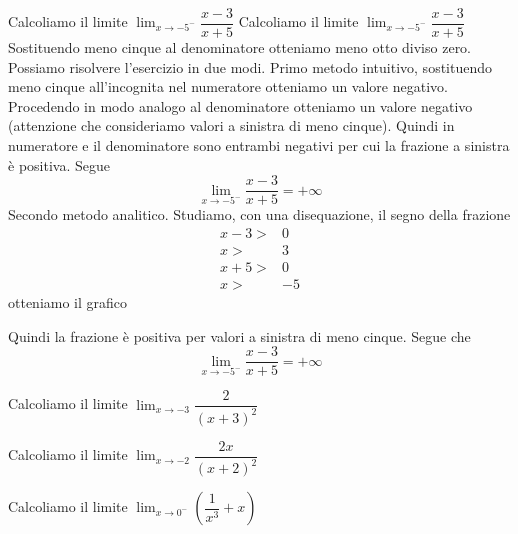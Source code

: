 \begin{exercise}
Calcoliamo il limite 
	$\lim_{x\to -5^-}\dfrac{x-3}{x+5}$
	\tcblower
	Calcoliamo il limite 
	$\lim_{x\to -5^-}\dfrac{x-3}{x+5}$
	Sostituendo meno cinque al denominatore otteniamo meno otto diviso zero. Possiamo risolvere l'esercizio in due modi. Primo metodo intuitivo, sostituendo meno cinque all'incognita nel numeratore otteniamo un valore negativo. Procedendo in modo analogo al denominatore otteniamo un valore negativo (attenzione che consideriamo valori a sinistra di meno cinque). Quindi in numeratore e il denominatore sono entrambi negativi per cui la frazione a sinistra è positiva. Segue \begin{equation*}
	\lim_{x\to -5^-}\dfrac{x-3}{x+5}=+\infty
	\end{equation*} Secondo metodo analitico. Studiamo, con una disequazione, il segno della frazione
	\begin{align*}
	x-3>&0\\
	x>&3\\
	x+5>&0\\
	x>&-5
	\end{align*} 
	otteniamo il grafico
	\begin{center}
		
	\end{center}
	Quindi la frazione è positiva per valori a sinistra di meno cinque. Segue che 
	\begin{equation*}
		\lim_{x\to -5^-}\dfrac{x-3}{x+5}=+\infty
	\end{equation*}
\end{exercise}
	\begin{exercise}[no solution]
Calcoliamo il limite
	$\lim_{x\to -3}\dfrac{2}{(x+3)^2}$

\end{exercise}
	\begin{exercise}[no solution]
Calcoliamo il limite
	$\lim_{x\to -2}\dfrac{2x}{(x+2)^2}$
\end{exercise}
	\begin{exercise}[no solution]
	Calcoliamo il limite
	$\lim_{x\to 0^-}\left(\dfrac{1}{x^3}+x\right)$
\end{exercise}
